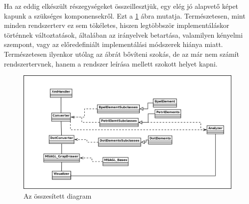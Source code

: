 Ha az eddig elkészült részegységeket összeillesztjük, egy elég jó alapvető képet kapunk a szükséges komponensekről. Ezt a \ref{fig:sysdes} ábra mutatja. Természetesen, mint minden rendszerterv ez sem tökéletes, hiszen legtöbbször implementáláskor történnek változtatások, általában az irányelvek betartása, valamilyen kényelmi szempont, vagy az előredefiniált implementálási módszerek hiánya miatt. Természetesen ilyenkor utólag az ábrát bővíteni szokás, de az már nem számít rendszertervnek, hanem a rendszer leírása mellett szokott helyet kapni. 
\begin{landscape}
\begin{figure}[h!]
\centering
\includegraphics[scale=0.5]{images/sumdia.png}
\caption{Az összesített diagram}
\label{fig:sysdes}
\end{figure}
\end{landscape}

